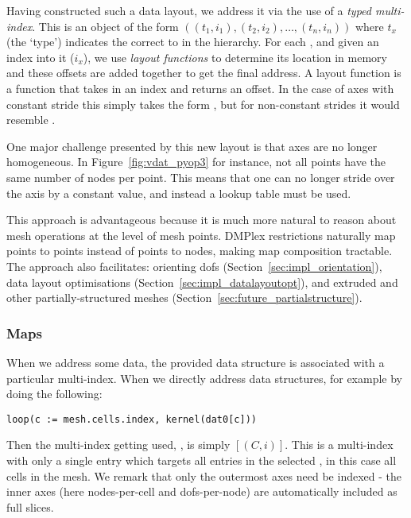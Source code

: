 Having constructed such a data layout, we address it via the use of a \textit{typed multi-index}.
This is an object of the form $((t_1, i_1), (t_2, i_2), \dots, (t_n, i_n))$ where $t_x$ (the `type') indicates the correct  to in the hierarchy.
For each , and given an index into it ($i_x$), we use \textit{layout functions} to determine its location in memory and these offsets are added together to get the final address.
A layout function is a function that takes in an index and returns an offset.
In the case of axes with constant stride this simply takes the form , but for non-constant strides it would resemble .

One major challenge presented by this new layout is that axes are no longer homogeneous.
In Figure~\ref{fig:vdat_pyop3} for instance, not all points have the same number of nodes per point.
This means that one can no longer stride over the axis by a constant value, and instead a lookup table must be used.

This approach is advantageous because it is much more natural to reason about mesh operations at the level of mesh points.
DMPlex restrictions naturally map points to points instead of points to nodes, making map composition tractable.
The approach also facilitates: orienting \glspl{dof} (Section~\ref{sec:impl_orientation}), data layout optimisations (Section~\ref{sec:impl_datalayoutopt}), and extruded and other partially-structured meshes (Section~\ref{sec:future_partialstructure}).


\subsubsection{Maps}

When we address some data, the provided data structure is associated with a particular multi-index.
When we directly address data structures, for example by doing the following:

\begin{verbatim}
loop(c := mesh.cells.index, kernel(dat0[c]))
\end{verbatim}

Then the multi-index getting used, , is simply $[(C, i)]$.
This is a multi-index with only a single entry which targets all entries in the selected , in this case all cells in the mesh.
We remark that only the outermost axes need be indexed - the inner axes (here nodes-per-cell and \glspl{dof}-per-node) are automatically included as full slices.

